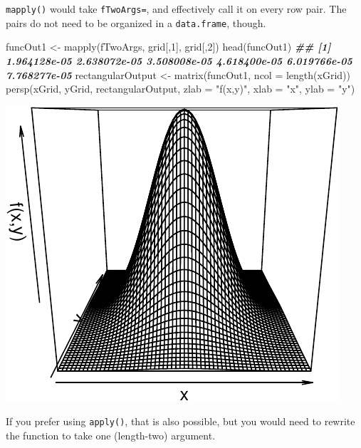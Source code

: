 \documentclass[
  12pt,
]{krantz}
\makeatletter
\newenvironment{Shaded}{\begin{snugshade}}{\end{snugshade}}
\newcommand{\AttributeTok}[1]{\textcolor[rgb]{0.61,0.61,0.61}{#1}}
\newcommand{\DecValTok}[1]{\textcolor[rgb]{0.06,0.06,0.06}{#1}}
\newcommand{\DocumentationTok}[1]{\textcolor[rgb]{0.37,0.37,0.37}{\textbf{\textit{#1}}}}
\newcommand{\FunctionTok}[1]{\textcolor[rgb]{0,0,0}{#1}}
\newcommand{\NormalTok}[1]{#1}
\newcommand{\OtherTok}[1]{\textcolor[rgb]{0.37,0.37,0.37}{#1}}
\newcommand{\StringTok}[1]{\textcolor[rgb]{0.5,0.5,0.5}{#1}}
\newenvironment{kframe}{%
\medskip{}
\setlength{\fboxsep}{.8em}
 \def\at@end@of@kframe{}%
 \ifinner\ifhmode%
  \def\at@end@of@kframe{\end{minipage}}%
  \begin{minipage}{\columnwidth}%
 \fi\fi%
 \def\FrameCommand##1{\hskip\@totalleftmargin \hskip-\fboxsep
 \colorbox{shadecolor}{##1}\hskip-\fboxsep
     \hskip-\linewidth \hskip-\@totalleftmargin \hskip\columnwidth}%
 \MakeFramed {\advance\hsize-\width
   \@totalleftmargin\z@ \linewidth\hsize
   \@setminipage}}%
 {\par\unskip\endMakeFramed%
 \at@end@of@kframe}
\renewenvironment{Shaded}{\begin{kframe}}{\end{kframe}}
\makeatother
\begin{document}
\texttt{mapply()} would take \texttt{fTwoArgs=}, and effectively call it on every row pair. The pairs do not need to be organized in a \texttt{data.frame}, though.

\begin{Shaded}
\begin{Highlighting}[]
\NormalTok{funcOut1 }\OtherTok{\textless{}{-}} \FunctionTok{mapply}\NormalTok{(fTwoArgs, grid[,}\DecValTok{1}\NormalTok{], grid[,}\DecValTok{2}\NormalTok{])}
\FunctionTok{head}\NormalTok{(funcOut1)}
\DocumentationTok{\#\# [1] 1.964128e{-}05 2.638072e{-}05 3.508008e{-}05 4.618400e{-}05 6.019766e{-}05 7.768277e{-}05}
\NormalTok{rectangularOutput }\OtherTok{\textless{}{-}} \FunctionTok{matrix}\NormalTok{(funcOut1, }\AttributeTok{ncol =} \FunctionTok{length}\NormalTok{(xGrid))}
\FunctionTok{persp}\NormalTok{(xGrid, yGrid, rectangularOutput, }
      \AttributeTok{zlab =} \StringTok{"f(x,y)"}\NormalTok{, }\AttributeTok{xlab =} \StringTok{"x"}\NormalTok{, }\AttributeTok{ylab =} \StringTok{"y"}\NormalTok{)}
\end{Highlighting}
\end{Shaded}

\includegraphics{r_and_python_book_files/figure-latex/unnamed-chunk-223-1.pdf}

If you prefer using \texttt{apply()}, that is also possible, but you would need to rewrite the function to take one (length-two) argument.
\end{document}
